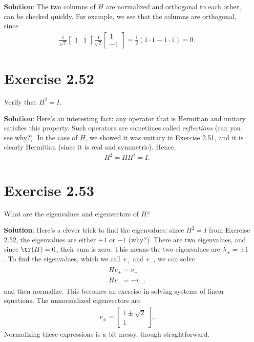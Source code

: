 \documentclass{book}
\begin{document}
    \textbf{Solution}: The two columns of $H$ are normalized and orthogonal to each other, can be checked quickly. For example, we see that the columns are orthogonal, since
    \begin{align}
        \frac{1}{\sqrt{2}}\begin{bmatrix}
            1 & 1
        \end{bmatrix} \frac{1}{\sqrt{2}} \begin{bmatrix}
            1 \\
            -1
        \end{bmatrix} = \frac{1}{2}(1\cdot 1 - 1\cdot 1) = 0.
    \end{align}
    
\section*{Exercise 2.52}
    Verify that $H^2 = I$.
    
    \textbf{Solution}: Here's an interesting fact: any operator that is Hermitian and unitary satisfies this property. Such operators are sometimes called \emph{reflections} (can you see why?). In the case of $H$, we showed it was unitary in Exercise 2.51, and it is clearly Hermitian (since it is real and symmetric). Hence,
    \begin{align}
        H^2 = H H^\dagger = I.
    \end{align}
    
\section*{Exercise 2.53}
    What are the eigenvalues and eigenvectors of $H$?
    
    \textbf{Solution}: Here's a clever trick to find the eigenvalues: since $H^2 = I$ from Exercise 2.52, the eigenvalues are either $+1$ or $-1$ (why?). There are two eigenvalues, and since $\tr(H) = 0$, their sum is zero. This means the two eigenvalues are $\lambda_{\pm} = \pm 1$. To find the eigenvalues, which we call $v_+$ and $v_-$, we can solve 
    \begin{align}
    \begin{aligned}
        H v_+ = v_+ \\
        H v_- = -v_-.
    \end{aligned}
    \end{align}
    and then normalize. This becomes an exercise in solving systems of linear equations. The unnormalized eigenvectors are 
    \begin{align}
        v_{\pm} = \begin{bmatrix}
            1 \pm \sqrt{2} \\
            1
        \end{bmatrix}.
    \end{align}
    Normalizing these expressions is a bit messy, though straghtforward.
    
\end{document}

